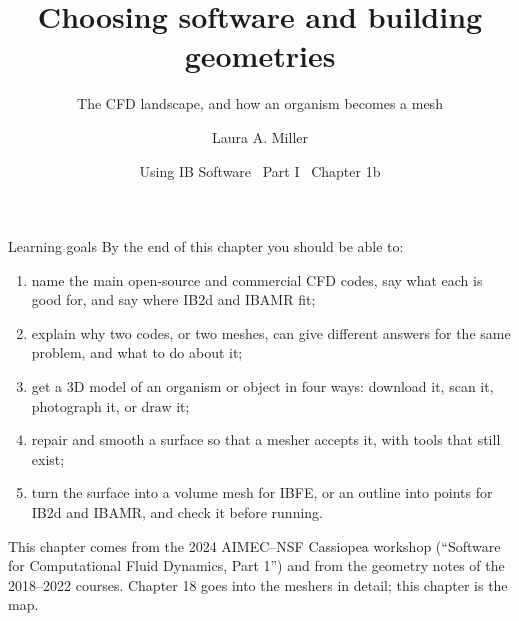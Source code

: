 \documentclass[aspectratio=169,11pt]{beamer}
\title[Software and geometries]{Choosing software and building geometries}
\subtitle{The CFD landscape, and how an organism becomes a mesh}
\author[Miller]{Laura A. Miller}
\institute[UArizona]{Department of Mathematics, University of Arizona}
\date{Using IB Software \textbullet\ Part I \textbullet\ Chapter 1b}
\begin{document}
\begin{frame}[plain]
\end{frame}

\begin{frame}{Learning goals}
By the end of this chapter you should be able to:
\begin{enumerate}
  \item name the main open-source and commercial CFD codes, say what each is good for, and say where IB2d and IBAMR fit;
  \item explain why two codes, or two meshes, can give different answers for the same problem, and what to do about it;
  \item get a 3D model of an organism or object in four ways: download it, scan it, photograph it, or draw it;
  \item repair and smooth a surface so that a mesher accepts it, with tools that still exist;
  \item turn the surface into a volume mesh for IBFE, or an outline into points for IB2d and IBAMR, and check it before running.
\end{enumerate}
\vspace{3mm}
\begin{punchbox}
\small This chapter comes from the 2024 AIMEC--NSF Cassiopea workshop (``Software for Computational Fluid Dynamics, Part 1'') and from the geometry notes of the 2018--2022 courses. Chapter 18 goes into the meshers in detail; this chapter is the map.
\end{punchbox}
\end{frame}
\end{document}
